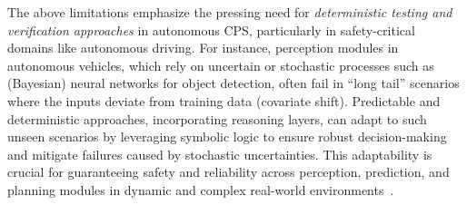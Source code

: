The above limitations emphasize the pressing need for \textit{deterministic testing and verification approaches} in autonomous CPS, particularly in safety-critical domains like autonomous driving. For instance, perception modules in autonomous vehicles, which rely on uncertain or stochastic processes such as (Bayesian) neural networks for object detection, often fail in ``long tail'' scenarios where the inputs deviate from training data (covariate shift). Predictable and deterministic approaches, incorporating reasoning layers, can adapt to such unseen scenarios by leveraging symbolic logic to ensure robust decision-making and mitigate failures caused by stochastic uncertainties. This adaptability is crucial for guaranteeing safety and reliability across perception, prediction, and planning modules in dynamic and complex real-world environments~\cite{shalev2017formal, seshia2017compositional, zapridou2020runtime}.




